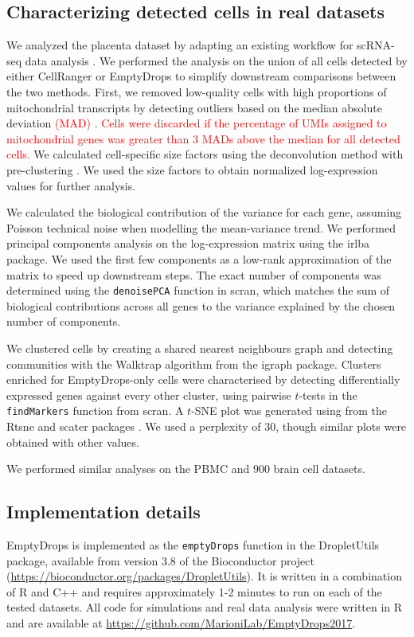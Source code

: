 \documentclass[10pt,letterpaper]{article}
\newcommand{\code}[1]{\texttt{#1}}
\newcommand{\revised}[1]{\textcolor{red}{#1}}
\begin{document}
\subsection*{Characterizing detected cells in real datasets}
We analyzed the placenta dataset by adapting an existing workflow for scRNA-seq data analysis \cite{lun2016stepbystep}.
We performed the analysis on the union of all cells detected by either CellRanger or EmptyDrops to simplify downstream comparisons between the two methods.
First, we removed low-quality cells with high proportions of mitochondrial transcripts by detecting outliers based on the median absolute deviation \revised{(MAD)} \cite{mccarthy2017scater}.
\revised{Cells were discarded if the percentage of UMIs assigned to mitochondrial genes was greater than 3 MADs above the median for all detected cells.}
We calculated cell-specific size factors using the deconvolution method with pre-clustering \cite{lun2016pooling}.
We used the size factors to obtain normalized log-expression values for further analysis.

We calculated the biological contribution of the variance for each gene, assuming Poisson technical noise when modelling the mean-variance trend.
We performed principal components analysis on the log-expression matrix using the \textsf{irlba} package.
We used the first few components as a low-rank approximation of the matrix to speed up downstream steps.
The exact number of components was determined using the \code{denoisePCA} function in \textsf{scran},
which matches the sum of biological contributions across all genes to the variance explained by the chosen number of components.

We clustered cells by creating a shared nearest neighbours graph \cite{xu2015identification} and detecting communities with the Walktrap algorithm from the \textsf{igraph} package.
Clusters enriched for EmptyDrops-only cells were characterised by detecting differentially expressed genes against every other cluster,
using pairwise $t$-tests in the \code{findMarkers} function from \textsf{scran}.
A $t$-SNE plot \cite{van2008visualizing} was generated using from the \textsf{Rtsne} and \textsf{scater} packages \cite{mccarthy2017scater}.
We used a perplexity of 30, though similar plots were obtained with other values.

We performed similar analyses on the PBMC and 900 brain cell datasets.

\subsection*{Implementation details}
EmptyDrops is implemented as the \code{emptyDrops} function in the \textsf{DropletUtils} package, available from version 3.8 of the Bioconductor project (\url{https://bioconductor.org/packages/DropletUtils}).
It is written in a combination of R and C++ and requires approximately 1-2 minutes to run on each of the tested datasets.
All code for simulations and real data analysis were written in R and are available at \url{https://github.com/MarioniLab/EmptyDrops2017}.
\end{document}
